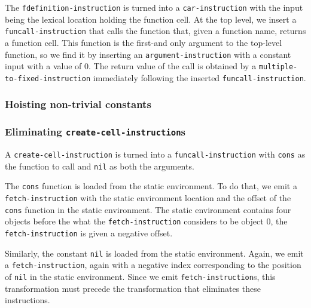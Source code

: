The \texttt{fdefinition-instruction} is turned into a
\texttt{car-instruction} with the input being the lexical location
holding the function cell.  At the top level, we insert a
\texttt{funcall-instruction} that calls the function that, given a
function name, returns a function cell.  This function is the
first-and only argument to the top-level function, so we find it by
inserting an \texttt{argument-instruction} with a constant input with
a value of $0$.  The return value of the call is obtained by a
\texttt{multiple-to-fixed-instruction} immediately following the
inserted \texttt{funcall-instruction}.%

\subsubsection{Hoisting non-trivial constants}

\subsubsection{Eliminating \texttt{create-cell-instruction}s}

A \texttt{create-cell-instruction} is turned into a
\texttt{funcall-instruction} with \texttt{cons} as the function to
call and \texttt{nil} as both the arguments.

The \texttt{cons} function is loaded from the static environment.  To
do that, we emit a \texttt{fetch-instruction} with the static
environment location and the offset of the \texttt{cons} function in
the static environment.  The static environment contains four objects
before the what the \texttt{fetch-instruction} considers to be object
$0$, the \texttt{fetch-instruction} is given a negative offset.

Similarly, the constant \texttt{nil} is loaded from the static
environment.  Again, we emit a \texttt{fetch-instruction}, again with
a negative index corresponding to the position of \texttt{nil} in the
static environment.  Since we emit \texttt{fetch-instruction}s, this
transformation must precede the transformation that eliminates
these instructions.%

